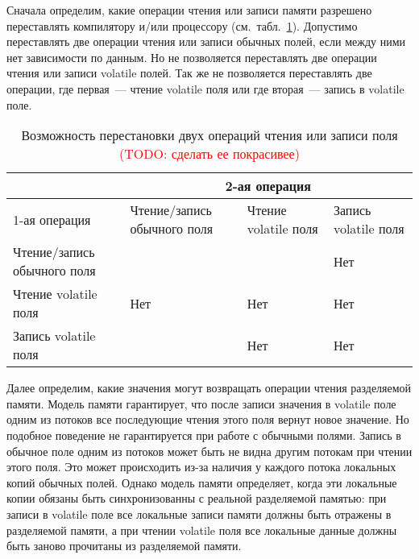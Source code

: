 \documentclass[14pt,titlepage]{extarticle}
\newcommand{\todo}[1]{\textcolor{red}{(\eng{TODO}: #1)}}
\newcommand{\eng}[1]{{\English#1}}
\begin{document}
      Сначала определим, какие операции чтения или записи памяти разрешено
      переставлять компилятору и/или процессору
      (см.~табл.~\ref{tabular:can_reorder}).
      Допустимо переставлять две операции чтения или записи обычных полей, если
      между ними нет зависимости по данным. Но не позволяется переставлять две
      операции чтения или записи \eng{volatile} полей. Так же не позволяется
      переставлять две операции, где первая~--- чтение \eng{volatile} поля или
      где вторая~--- запись в \eng{volatile} поле.

      \begin{table}[!htb]
        \centering
        \begin{tabular}{ |p{}|p{}|p{}|p{}| }
          \hline
          & \multicolumn{3}{c|}{2-ая операция} \\ \hline
          1-ая операция & Чтение/запись обычного поля
                        & Чтение \eng{volatile} поля
                        & Запись \eng{volatile} поля \\ \hline
          Чтение/запись обычного поля &     &     & Нет \\ \hline
          Чтение \eng{volatile} поля  & Нет & Нет & Нет \\ \hline
          Запись \eng{volatile} поля  &     & Нет & Нет \\ \hline
        \end{tabular}
        \caption{Возможность перестановки двух операций чтения или записи поля
                 \todo{сделать ее покрасивее}}
        \label{tabular:can_reorder}
      \end{table}

      Далее определим, какие значения могут возвращать операции чтения
      разделяемой памяти. Модель памяти гарантирует, что после записи значения
      в \eng{volatile} поле одним из потоков все последующие чтения этого поля
      вернут новое значение. Но подобное поведение не гарантируется при работе
      с обычными полями. Запись в обычное поле одним из потоков может быть не
      видна другим потокам при чтении этого поля. Это может происходить из-за
      наличия у каждого потока локальных копий обычных полей.  Однако модель
      памяти определяет, когда эти локальные копии обязаны быть синхронизованны
      с реальной разделяемой памятью: при записи в \eng{volatile} поле все
      локальные записи памяти должны быть отражены в разделяемой памяти, а при
      чтении \eng{volatile} поля все локальные данные должны быть заново
      прочитаны из разделяемой памяти.
\end{document}
